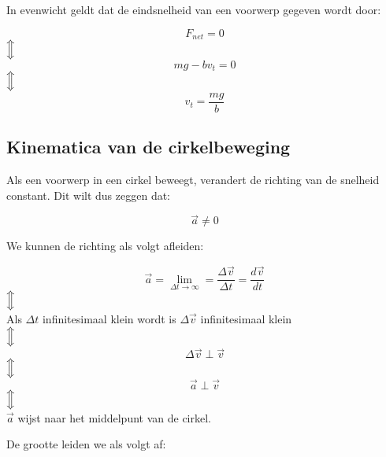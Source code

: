 \documentclass[12pt,a4paper]{article}
\newcommand{\Luda}{\Big\Updownarrow}
\begin{document}
   In evenwicht geldt dat de eindsnelheid van een voorwerp gegeven wordt door:
   
   \begin{center}
   	 \[F_{net} = 0\]
	  $\Luda$\[mg - bv_{t} = 0\]
	  $\Luda$\[v_{t} = \frac{mg}{b}\]
    \end{center}	  

    \subsection{Kinematica van de cirkelbeweging}
    Als een voorwerp in een cirkel beweegt, verandert de richting van de snelheid constant. Dit wilt dus zeggen dat:
    
    $$ \vec{a} \neq 0$$
    
    We kunnen de richting als volgt afleiden:
    
    \begin{center}
    	\[\vec{a} = \lim_{\Delta t\to\infty} = \frac{\Delta \vec{v}}{\Delta t} = \frac{d\vec{v}}{dt}\]
    	$\Luda$\\
    	Als $\Delta t$ infinitesimaal klein wordt is $\Delta \vec{v}$ infinitesimaal klein\\
    	$\Luda$\[\Delta\vec{v} \perp \vec{v}\]
    	$\Luda$\[\vec{a} \perp \vec{v}\]
    	$\Luda$\\ 
    	$\vec{a}$ wijst naar het middelpunt van de cirkel.
    \end{center}
    
    De grootte leiden we als volgt af:
    
\end{document}
